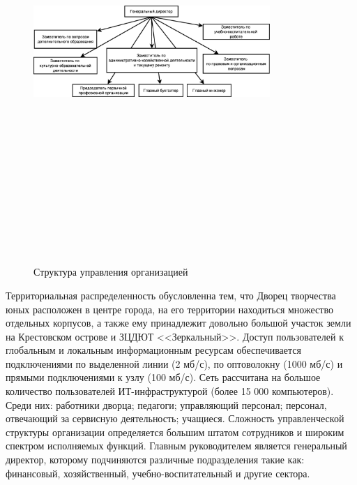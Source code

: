 \documentclass[utf8,usehyperref,12pt]{G7-32}
\begin{document}
\begin{figure}[ht]
   \centering%
   \includegraphics[height=160mm, width=0.8\textwidth, clip, keepaspectratio]{pictures/management_structure.eps}
   \caption{Структура управления организацией}\label{fig:fig_management_struct}
 \end{figure}

Территориальная распределенность обусловленна тем, что Дворец творчества юных расположен в центре города, на его территории находиться множество отдельных корпусов, а также ему принадлежит довольно большой участок земли на Крестовском острове и ЗЦДЮТ <<Зеркальный>>. Доступ пользователей к глобальным и локальным информационным ресурсам обеспечивается подключениями по выделенной линии
(2 мб/с), по оптоволокну (1000 мб/с) и прямыми подключениями к узлу (100 мб/с). Сеть рассчитана на большое количество пользователей ИТ-инфраструктурой (более
15 000 компьютеров). Среди них: работники дворца; педагоги; управляющий персонал;  персонал, отвечающий за сервисную деятельность; учащиеся. Сложность управленческой структуры организации определяется большим штатом сотрудников и широким спектром исполняемых функций. Главным руководителем является генеральный директор, которому подчиняются различные подразделения такие как: финансовый, хозяйственный, учебно-воспитательный и другие сектора.
\end{document}
